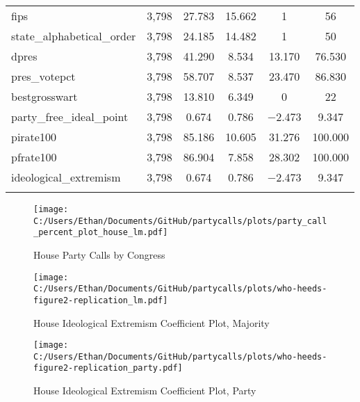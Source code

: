 \documentclass[12pt]{article}
\begin{document}
\begin{table}[!htbp]
\begin{tabular}{@{\extracolsep{5pt}}lccccc}
		fips & 3,798 & 27.783 & 15.662 & 1 & 56 \\ 
		state\_alphabetical\_order & 3,798 & 24.185 & 14.482 & 1 & 50 \\ 
		dpres & 3,798 & 41.290 & 8.534 & 13.170 & 76.530 \\ 
		pres\_votepct & 3,798 & 58.707 & 8.537 & 23.470 & 86.830 \\ 
		bestgrosswart & 3,798 & 13.810 & 6.349 & 0 & 22 \\ 
		party\_free\_ideal\_point & 3,798 & 0.674 & 0.786 & $-$2.473 & 9.347 \\ 
		pirate100 & 3,798 & 85.186 & 10.605 & 31.276 & 100.000 \\ 
		pfrate100 & 3,798 & 86.904 & 7.858 & 28.302 & 100.000 \\ 
		ideological\_extremism & 3,798 & 0.674 & 0.786 & $-$2.473 & 9.347 \\ 
		\hline \\[-1.8ex] 
	\end{tabular} 
\end{table} 

\begin{figure}[H]
	\centering
	\caption{House Party Calls by Congress}
	\texttt{[image: C:/Users/Ethan/Documents/GitHub/partycalls/plots/party\_call\_percent\_plot\_house\_lm.pdf]}
\end{figure}

\begin{figure}[H]
	\centering
	\caption{House Ideological Extremism Coefficient Plot, Majority}
	\texttt{[image: C:/Users/Ethan/Documents/GitHub/partycalls/plots/who-heeds-figure2-replication\_lm.pdf]}
\end{figure}

\begin{figure}[H]
	\centering
	\caption{House Ideological Extremism Coefficient Plot, Party}
	\texttt{[image: C:/Users/Ethan/Documents/GitHub/partycalls/plots/who-heeds-figure2-replication\_party.pdf]}
\end{figure}
\end{document}
